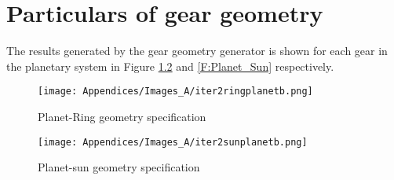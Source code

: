 \chapter{Particulars of gear geometry} \label{A:Gear_Geom}

The results generated by the gear geometry generator \cite{KHK2015} is shown for each gear in the planetary system in Figure \ref{F:Planet_Ring_Geom} and \ref{F:Planet_Sun} respectively.

\begin{figure}[H]
	\centering
	\texttt{[image: Appendices/Images\_A/iter2ringplanetb.png]}
	\caption{Planet-Ring geometry specification}
	\label{F:Planet_Ring_Geom}
\end{figure}

\begin{figure}[H]
	\centering
	\texttt{[image: Appendices/Images\_A/iter2sunplanetb.png]}
	\caption{Planet-sun geometry specification}
	\label{F:Planet_Ring_Geom}
\end{figure}
 		